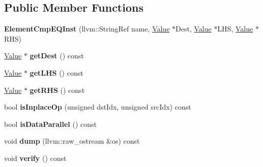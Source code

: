 \subsection*{Public Member Functions}
\begin{DoxyCompactItemize}
\item 
\mbox{\label{classglow_1_1_element_cmp_e_q_inst_a5bfb03694f7bb5a9fcef814cbdd69aa9}} 
{\bfseries Element\+Cmp\+E\+Q\+Inst} (llvm\+::\+String\+Ref name, \hyperlink{classglow_1_1_value}{Value} $\ast$Dest, \hyperlink{classglow_1_1_value}{Value} $\ast$L\+HS, \hyperlink{classglow_1_1_value}{Value} $\ast$R\+HS)
\item 
\mbox{\label{classglow_1_1_element_cmp_e_q_inst_a73e40bf44d248443756900eed21ff7b3}} 
\hyperlink{classglow_1_1_value}{Value} $\ast$ {\bfseries get\+Dest} () const
\item 
\mbox{\label{classglow_1_1_element_cmp_e_q_inst_a8631ccdfb3ef60c3c6b55defaa5701a9}} 
\hyperlink{classglow_1_1_value}{Value} $\ast$ {\bfseries get\+L\+HS} () const
\item 
\mbox{\label{classglow_1_1_element_cmp_e_q_inst_a4f6c6afd2bd1f7c7ab0786bb224802b3}} 
\hyperlink{classglow_1_1_value}{Value} $\ast$ {\bfseries get\+R\+HS} () const
\item 
\mbox{\label{classglow_1_1_element_cmp_e_q_inst_a422052bd1855fc4674020b72838ae63c}} 
bool {\bfseries is\+Inplace\+Op} (unsigned dst\+Idx, unsigned src\+Idx) const
\item 
\mbox{\label{classglow_1_1_element_cmp_e_q_inst_a7abb074497ea8423be14c751cae505ee}} 
bool {\bfseries is\+Data\+Parallel} () const
\item 
\mbox{\label{classglow_1_1_element_cmp_e_q_inst_a5e60788a9bf03c1960b9713d82f2f6c3}} 
void {\bfseries dump} (llvm\+::raw\+\_\+ostream \&os) const
\item 
\mbox{\label{classglow_1_1_element_cmp_e_q_inst_a5323a5955cb5bbb987df427fb6e0fb70}} 
void {\bfseries verify} () const
\end{DoxyCompactItemize}
